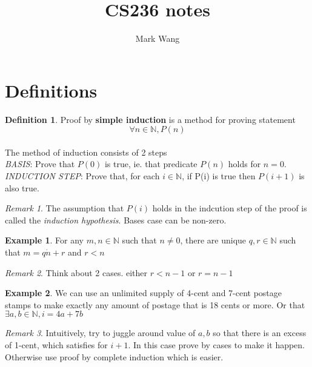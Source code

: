 \documentclass[11pt]{article}
\title{CS236 notes}
\author{Mark Wang}
\theoremstyle{plain}%
\theoremstyle{definition}
\newtheorem{defn}{Definition}
\newtheorem{exmp}{Example}[defn]
\theoremstyle{remark}
\newtheorem*{rem}{Remark}
\begin{document}
\maketitle


\section*{Definitions}




\begin{defn}
  \label{simple induction}
  Proof by \textbf{simple induction} is a method for proving statement
  \[
    \forall n\in \mathbb{N}, P(n)
  \]
  \\ The method of induction consists of 2 steps \\
  \textit{BASIS}: Prove that $P(0)$ is true, ie. that predicate $P(n)$ holds for $n=0$. \\
  \textit{INDUCTION STEP}: Prove that, for each $i\in \mathbb{N}$, if P(i) is true then $P(i+1)$ is also true. \\
  \begin{rem}
    The assumption that $P(i)$ holds in the indcution step of the proof is called the \textit{induction hypothesis}. Bases case can be non-zero.
  \end{rem}

  \begin{exmp}
    For any $m, n\in \mathbb{N}$ such that $n\neq 0$, there are unique $q,r\in \mathbb{N}$ such that $m=q\dot n + r$ and $r < n$

    \begin{rem}
      Think about 2 cases. either $r< n-1$ or $r=n-1$
    \end{rem}
  \end{exmp}

  \begin{exmp}
    We can use an unlimited supply of 4-cent and 7-cent postage stamps to make exactly any amount of postage that is 18 cents or more. Or that $\exists a,b\in \mathbb{N}, i=4a + 7b$

    \begin{rem}
      Intuitively, try to juggle around value of $a,b$ so that there is an excess of 1-cent, which satisfies for $i+1$. In this case prove by cases to make it happen. Otherwise use proof by complete induction which is easier.
    \end{rem}
  \end{exmp}
\end{defn}
\end{document}
